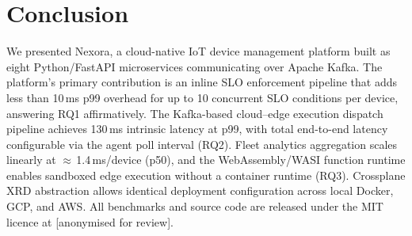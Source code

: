 \documentclass[twocolumn,smallextended]{svjour3}
\begin{document}
\section{Conclusion}
\label{sec:conclusion}

We presented Nexora, a cloud-native IoT device management platform built as
eight Python/FastAPI microservices communicating over Apache Kafka. The
platform's primary contribution is an inline SLO enforcement pipeline that
adds less than 10\,ms p99 overhead for up to 10 concurrent SLO conditions
per device, answering RQ1 affirmatively. The Kafka-based cloud--edge execution
dispatch pipeline achieves 130\,ms intrinsic latency at p99, with total
end-to-end latency configurable via the agent poll interval (RQ2).
Fleet analytics aggregation scales linearly at $\approx$\,1.4\,ms/device (p50),
and the WebAssembly/WASI function runtime enables sandboxed edge execution
without a container runtime (RQ3). Crossplane XRD abstraction allows
identical deployment configuration across local Docker, GCP, and AWS.
All benchmarks and source code are released under the MIT licence at
[anonymised for review].

%


\end{document}
